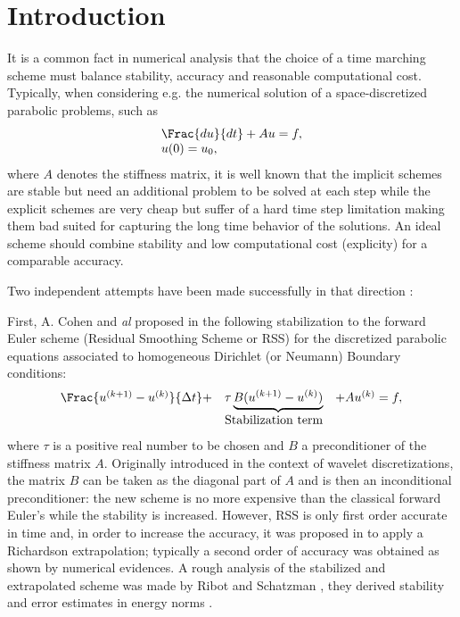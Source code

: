 {\section{Introduction}
It is a common fact in numerical analysis that the choice of a time
marching scheme must balance stability, accuracy and reasonable computational
cost. Typically, when considering e.g. the numerical solution of a space-discretized
parabolic problems, such as
\begin{equation}
\begin{array}{l}
\Frac{du}{dt} +Au=f,\\
u(0)=u_0,
\end{array}
\end{equation}
where $A$ denotes the stiffness matrix, it is well known that  the implicit schemes are stable but need an
additional problem to be solved at each step while the explicit
schemes are very cheap but suffer of a hard time step limitation
making them bad suited for capturing the long time behavior of the
solutions. An ideal scheme should combine stability and low
computational cost (explicity) for a comparable accuracy.

Two independent attempts have been made successfully in that
direction :


First, A. Cohen and {\it al}  proposed in 
\cite{AverbuchCohenIsraeli} the following stabilization to the
forward Euler scheme (Residual Smoothing Scheme or RSS) for the discretized parabolic equations associated to homogeneous Dirichlet (or Neumann) Boundary conditions:
\begin{equation}
\begin{array}{lcl}
\Frac{u^{(k+1)}-u^{(k)}}{\Delta t}+&\tau
\underbrace{B(u^{(k+1)}-u^{(k)})}&+Au^{(k)}=f,\\
 & \mbox{Stabilization term}& \\
 \end{array}
\end{equation}
where $\tau$ is a positive real number to be chosen and $B$ a preconditioner of the stiffness matrix $A$.
Originally introduced in the context of wavelet discretizations, the
matrix $B$ can be taken as the diagonal part of $A$ and is then an inconditional preconditioner: the new scheme
is no more expensive than the classical forward Euler's while the
stability is increased. However, RSS is only first order accurate in
time and, in order to increase the accuracy, it was proposed in
\cite{AverbuchCohenIsraeli} to apply a Richardson extrapolation; typically a second order of accuracy was
obtained as shown by numerical evidences. A rough analysis of the
stabilized and extrapolated scheme was made by Ribot and Schatzman
\cite{MRibotMSchatzman,RibotSchatzman2}, they derived stability and error estimates in energy norms .

}
